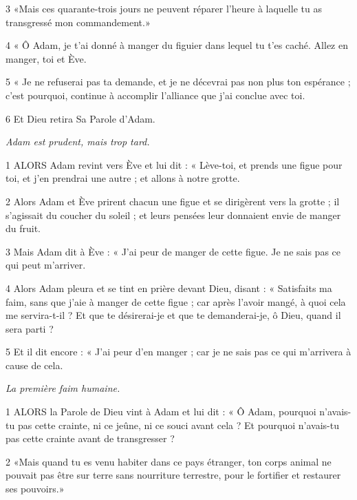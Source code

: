 \par 3 «Mais ces quarante-trois jours ne peuvent réparer l'heure à laquelle tu as transgressé mon commandement.»

\par 4 « Ô Adam, je t'ai donné à manger du figuier dans lequel tu t'es caché. Allez en manger, toi et Ève.

\par 5 « Je ne refuserai pas ta demande, et je ne décevrai pas non plus ton espérance ; c’est pourquoi, continue à accomplir l’alliance que j’ai conclue avec toi.

\par 6 Et Dieu retira Sa Parole d'Adam.


\par \textit{Adam est prudent, mais trop tard.}

\par 1 ALORS Adam revint vers Ève et lui dit : « Lève-toi, et prends une figue pour toi, et j'en prendrai une autre ; et allons à notre grotte.

\par 2 Alors Adam et Ève prirent chacun une figue et se dirigèrent vers la grotte ; il s’agissait du coucher du soleil ; et leurs pensées leur donnaient envie de manger du fruit.

\par 3 Mais Adam dit à Ève : « J'ai peur de manger de cette figue. Je ne sais pas ce qui peut m’arriver.

\par 4 Alors Adam pleura et se tint en prière devant Dieu, disant : « Satisfaits ma faim, sans que j'aie à manger de cette figue ; car après l'avoir mangé, à quoi cela me servira-t-il ? Et que te désirerai-je et que te demanderai-je, ô Dieu, quand il sera parti ?

\par 5 Et il dit encore : « J'ai peur d'en manger ; car je ne sais pas ce qui m’arrivera à cause de cela.


\par \textit{La première faim humaine.}

\par 1 ALORS la Parole de Dieu vint à Adam et lui dit : « Ô Adam, pourquoi n'avais-tu pas cette crainte, ni ce jeûne, ni ce souci avant cela ? Et pourquoi n’avais-tu pas cette crainte avant de transgresser ?

\par 2 «Mais quand tu es venu habiter dans ce pays étranger, ton corps animal ne pouvait pas être sur terre sans nourriture terrestre, pour le fortifier et restaurer ses pouvoirs.»

